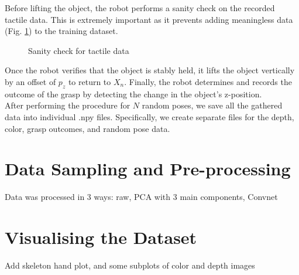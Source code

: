 \documentclass[11pt, a4paper]{report}
\theoremstyle{definition}
\begin{document}
Before lifting the object, the robot performs a sanity check on the recorded tactile data. This is extremely important as it prevents adding meaningless data (Fig. \ref{fig:1}) to the training dataset.
\begin{figure}[H]%
    \centering
    \qquad
    \caption{Sanity check for tactile data}%
    \label{fig:1}%
\end{figure}

Once the robot verifies that the object is stably held, it lifts the object vertically by an offset of $p_z$ to return to $X_n$. Finally, the robot determines and records the outcome of the grasp by detecting the change in the object's z-position.\\

After performing the procedure for $N$ random poses, we save all the gathered data into individual .npy files. Specifically, we create separate files for the depth, color, grasp outcomes, and random pose data.

\section{Data Sampling and Pre-processing}
\label{sec:4.2}
Data was processed in 3 ways: raw, PCA with 3 main components, Convnet

\section{Visualising the Dataset}
Add skeleton hand plot, and some subplots of color and depth images
\end{document}
